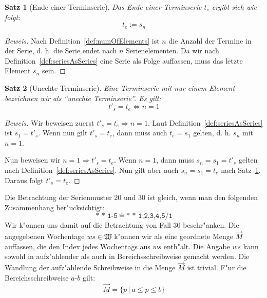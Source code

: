 \documentclass[a4paper]{article}
\newcommand*{\wkdays}{\mathfrak{W}}
\numberwithin{equation}{section}
\newtheorem{thm}{Satz}
\begin{document}
\begin{thm}[Ende einer Terminserie]\label{thm:endOfSeries}
  Das Ende einer Terminserie $t_e$ ergibt sich wie folgt:
  \begin{equation}t_e := s_n\end{equation}
\end{thm}
\begin{proof}[Beweis]
  Nach Definition~\ref{def:numOfElements} ist $n$ die Anzahl der Termine in der
  Serie, d. h. die Serie endet nach $n$ Serienelementen. Da wir nach
  Definition~\ref{def:seriesAsSeries} eine Serie als Folge auf\mbox{}fassen,
  muss das letzte Element $s_n$ sein.
\end{proof}

\begin{thm}[Unechte Terminserie]
  Eine Terminserie mit nur einem Element bezeichnen wir als "`unechte
  Terminserie"'. Es gilt:
  \begin{equation}t'_s = t_e \Leftrightarrow n = 1\end{equation}
\end{thm}
\begin{proof}[Beweis]
  Wir beweisen zuerst $t'_s = t_e \Rightarrow n = 1$. Laut
  Definition~\ref{def:seriesAsSeries} ist $s_1 = t'_s$. Wenn nun gilt
  $t'_s = t_e$, dann muss auch $t_e = s_1$ gelten, d. h. $s_n$ mit $n = 1$.
  \par
  Nun beweisen wir $n = 1 \Rightarrow t'_s = t_e$. Wenn $n = 1$, dann muss
  $s_n = s_1 = t'_s$ gelten nach Definition~\ref{def:seriesAsSeries}. Nun gilt
  aber auch $s_n = s_1 = t_e$ nach Satz~\ref{thm:endOfSeries}. Daraus folgt
  $t'_s = t_e$.
\end{proof}

Die Betrachtung der Serienmuster 20 und 30 ist gleich, wenn man den folgenden
Zusammenhang ber"ucksichtigt:
\begin{equation}
  \label{eqn:20to30}\texttt{* * 1-5}\ \hat{=}\ \texttt{* * 1,2,3,4,5/1}
\end{equation}
Wir k"onnen uns damit auf die Betrachtung von Fall 30 beschr"anken. Die
angegebenen Wochentage $ws \in \wkdays$ k"onnen wir als eine geordnete Menge
$\vec{M}$ auf\mbox{}fassen, die den Index jedes Wochentags aus $ws$ enth"alt.
Die Angabe $ws$ kann sowohl in aufz"ahlender als auch in Bereichsschreibweise
gemacht werden. Die Wandlung der aufz"ahlende Schreibweise in die Menge
$\vec{M}$ ist trivial. F"ur die Bereichsschreibweise $a$-$b$ gilt:
\begin{equation}\label{eqn:range}
  \vec{M} = \{ p\,|\ a \le p \le b \}
\end{equation}
\end{document}
